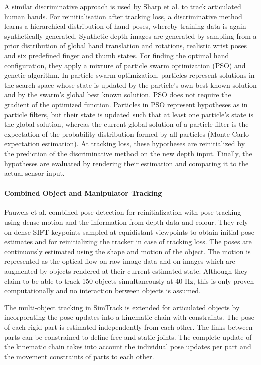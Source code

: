 A similar discriminative approach is used by Sharp et al. \cite{Sharp2015} to track articulated human hands. For reinitialisation after tracking loss, a discriminative method learns a hierarchical distribution of hand poses, whereby training data is again synthetically generated. Synthetic depth images are generated by sampling from a prior distribution of global hand translation and rotations, realistic wrist poses and six predefined finger and thumb states.
For finding the optimal hand configuration, they apply a mixture of particle swarm optimization (PSO) and genetic algorithm. In particle swarm optimization, particles represent solutions in the search space whose state is updated by the particle's own best known solution and by the swarm's global best known solution. PSO does not require the gradient of the optimized function.
Particles in PSO represent hypotheses as in particle filters, but their state is updated such that at least one particle's state is the global solution, whereas the current global solution of a particle filter is the expectation of the probability distribution formed by all particles (Monte Carlo expectation estimation).
At tracking loss, these hypotheses are reinitialized by the prediction of the discriminative method on the new depth input. Finally, the hypotheses are evaluated by rendering their estimation and comparing it to the actual sensor input.

\paragraph{Combined Object and Manipulator Tracking}
Pauwels et al. \cite{Pauwels2015} combined pose detection for reinitialization with pose tracking using dense motion and the information from depth data and colour. They rely on dense SIFT keypoints sampled at equidistant viewpoints to obtain initial pose estimates and for reinitializing the tracker in case of tracking loss.
The poses are continuously estimated using the shape and motion of the object. The motion is represented as the optical flow on raw image data and on images which are augmented by objects rendered at their current estimated state.
Although they claim to be able to track 150 objects simultaneously at 40 Hz, this is only proven computationally and no interaction between objects is assumed.

The multi-object tracking in SimTrack is extended for articulated objects \cite{Pauwels2014} by incorporating the pose updates into a kinematic chain with constraints. The pose of each rigid part is estimated independently from each other. The links between parts can be constrained to define free and static joints. The complete update of the kinematic chain takes into account the individual pose updates per part and the movement constraints of parts to each other.

